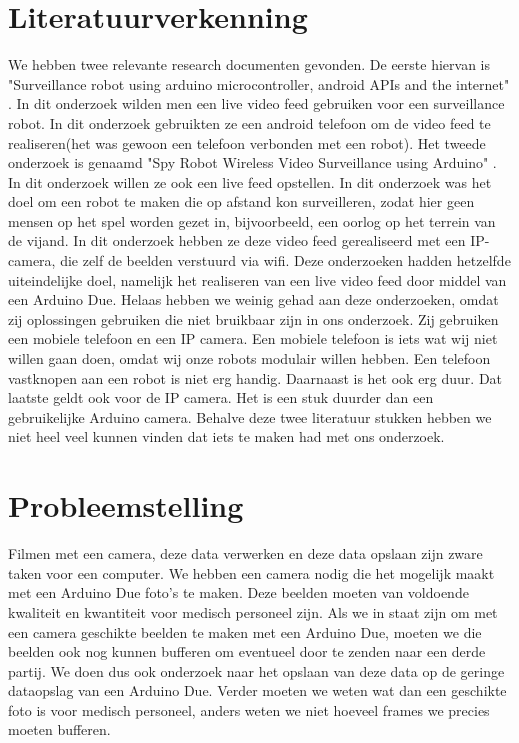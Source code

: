 \documentclass{article}
\begin{document}
\section{Literatuurverkenning}
We hebben twee relevante research documenten gevonden.
De eerste hiervan is "Surveillance robot using arduino microcontroller, android APIs and the internet" \citep{kulkarni2014surveillance}.
In dit onderzoek wilden men een live video feed gebruiken voor een surveillance robot.
In dit onderzoek gebruikten ze een android telefoon om de video feed te realiseren(het was gewoon een telefoon verbonden met een robot).
Het tweede onderzoek is genaamd "Spy Robot Wireless Video Surveillance using Arduino" \citep{maspy}.
In dit onderzoek willen ze ook een live feed opstellen.
In dit onderzoek was het doel om een robot te maken die op afstand kon surveilleren, zodat hier geen mensen op het spel worden gezet in, bijvoorbeeld, een oorlog op het terrein van de vijand.
In dit onderzoek hebben ze deze video feed gerealiseerd met een IP-camera, die zelf de beelden verstuurd via wifi.
Deze onderzoeken hadden hetzelfde uiteindelijke doel, namelijk het realiseren van een live video feed door middel van een Arduino Due.
Helaas hebben we weinig gehad aan deze onderzoeken, omdat zij oplossingen gebruiken die niet bruikbaar zijn in ons onderzoek.
Zij gebruiken een mobiele telefoon en een IP camera.
Een mobiele telefoon is iets wat wij niet willen gaan doen, omdat wij onze robots modulair willen hebben.
Een telefoon vastknopen aan een robot is niet erg handig.
Daarnaast is het ook erg duur. Dat laatste geldt ook voor de IP camera. Het is een stuk duurder dan een gebruikelijke Arduino camera.
Behalve deze twee literatuur stukken hebben we niet heel veel kunnen vinden dat iets te maken had met ons onderzoek.

\section{Probleemstelling}
Filmen met een camera, deze data verwerken en deze data opslaan zijn zware taken voor een computer.
We hebben een camera nodig die het mogelijk maakt met een Arduino Due foto’s te maken.
Deze beelden moeten van voldoende kwaliteit en kwantiteit voor medisch personeel zijn.
Als we in staat zijn om met een camera geschikte beelden te maken met een Arduino Due, moeten we die beelden ook nog kunnen bufferen om eventueel door te zenden naar een derde partij.
We doen dus ook onderzoek naar het opslaan van deze data op de geringe dataopslag van een Arduino Due.
Verder moeten we weten wat dan een geschikte foto is voor medisch personeel, anders weten we niet hoeveel frames we precies moeten bufferen.

\end{document}
